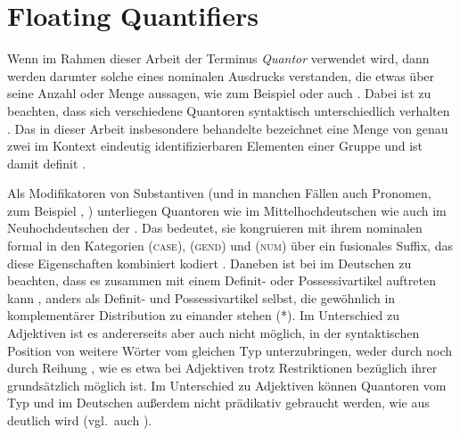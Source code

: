 

\section{Floating Quantifiers}
\label{sec:floatquant}

Wenn im Rahmen dieser Arbeit der Terminus \textit{Quantor} verwendet wird, dann
werden darunter solche  eines nominalen Ausdrucks
verstanden, die etwas über seine Anzahl oder Menge aussagen, wie zum Beispiel
 oder auch . Dabei ist zu beachten, dass
sich verschiedene Quantoren syntaktisch unterschiedlich verhalten
\autocites[27--28]{pittner1995}[11--12]{haspelmath1997}. Das in dieser Arbeit
insbesondere behandelte  bezeichnet eine Menge von genau
zwei im Kontext eindeutig identifizierbaren Elementen einer Gruppe
\autocite[vgl.][307]{keenan2006} und ist damit definit
\autocite[265--268]{lyons1999}.

Als Modifikatoren von Substantiven (und in
manchen Fällen auch Pronomen, zum Beispiel , )
unterliegen Quantoren wie  im
Mittelhochdeutschen wie auch  im
Neuhochdeutschen der . Das
bedeutet, sie kongruieren mit ihrem nominalen 
formal in den Kategorien  (\textsc{case}),
 (\textsc{gend}) und  (\textsc{num}) über ein
fusionales Suffix, das diese Eigenschaften kombiniert kodiert
\autocites(vgl.~auch ,
)[181--184]{ksw2}[772]{woellstein2022}. Daneben ist bei
 im Deutschen zu beachten, dass es zusammen mit
einem Definit- oder Possessivartikel auftreten kann
, anders als Definit- und Possessivartikel selbst, die
gewöhnlich in komplementärer Distribution zu
einander stehen (*). Im Unterschied zu
Adjektiven ist es andererseits aber auch nicht möglich,
in der syntaktischen Position von  weitere Wörter vom gleichen Typ
unterzubringen, weder durch   noch durch
Reihung , wie es etwa bei Adjektiven
trotz Restriktionen bezüglich ihrer  grundsätzlich möglich ist. Im
Unterschied zu Adjektiven können Quantoren vom Typ
 und  im Deutschen außerdem nicht
prädikativ gebraucht werden, wie aus  deutlich wird
(vgl.~auch \cite[181, Fußnote~1]{merchant1996}).

